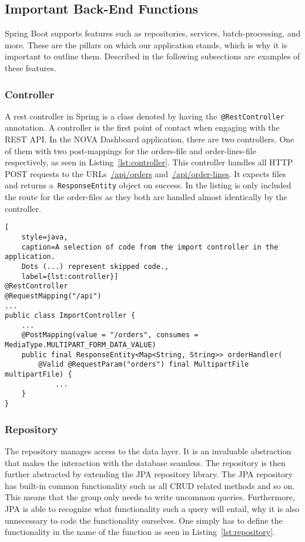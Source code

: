 \subsection{Important Back-End Functions}\label{subsec:important-back-end-functions}

Spring Boot supports features such as repositories, services, batch-processing, and more.
These are the pillars on which our application stands, which is why it is important to outline them.
Described in the following subsections are examples of these features.

\subsubsection{Controller}

A rest controller in Spring is a class denoted by having the~\texttt{@RestController} annotation.
A controller is the first point of contact when engaging with the REST API\@.
In the NOVA Dashboard application, there are two controllers.
One of them with two post-mappings for the orders-file and order-lines-file respectively, as seen in
Listing~\ref{lst:controller}.
This controller handles all HTTP POST requests to the URLs~\url{/api/orders} and~\url{/api/order-lines}.
It expects files and returns a~\texttt{ResponseEntity} object on success.
In the listing is only included the route for the order-files as they both are handled almost identically by the
controller.

\begin{lstlisting}[
    style=java,
    caption=A selection of code from the import controller in the application.
    Dots (...) represent skipped code.,
    label={lst:controller}]
@RestController
@RequestMapping("/api")
...
public class ImportController {
    ...
    @PostMapping(value = "/orders", consumes = MediaType.MULTIPART_FORM_DATA_VALUE)
    public final ResponseEntity<Map<String, String>> orderHandler(
        @Valid @RequestParam("orders") final MultipartFile multipartFile) {
            ...
    }
}
\end{lstlisting}

\subsubsection{Repository}

The repository manages access to the data layer.
It is an invaluable abstraction that makes the interaction with the database seamless.
The repository is then further abstracted by extending the JPA repository library.
The JPA repository has built-in common functionality such as all CRUD related methods and so on.
This means that the group only needs to write uncommon queries.
Furthermore, JPA is able to recognize what functionality such a query will entail,
why it is also unnecessary to code the functionality ourselves.
One simply has to define the functionality in the name of the function as seen in Listing~\ref{lst:repository}.


